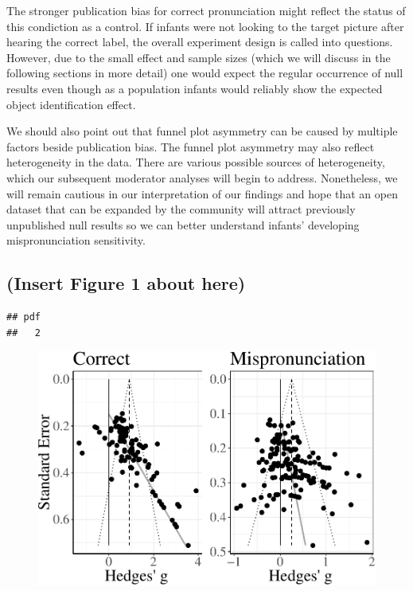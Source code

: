 \documentclass[man]{apa6}
\theoremstyle{definition}
\theoremstyle{definition}
\theoremstyle{definition}
\theoremstyle{remark}
\begin{document}
The stronger publication bias for correct pronunciation might reflect
the status of this condiction as a control. If infants were not looking
to the target picture after hearing the correct label, the overall
experiment design is called into questions. However, due to the small
effect and sample sizes (which we will discuss in the following sections
in more detail) one would expect the regular occurrence of null results
even though as a population infants would reliably show the expected
object identification effect.

We should also point out that funnel plot asymmetry can be caused by
multiple factors beside publication bias. The funnel plot asymmetry may
also reflect heterogeneity in the data. There are various possible
sources of heterogeneity, which our subsequent moderator analyses will
begin to address. Nonetheless, we will remain cautious in our
interpretation of our findings and hope that an open dataset that can be
expanded by the community will attract previously unpublished null
results so we can better understand infants' developing mispronunciation
sensitivity.

\subsection{(Insert Figure 1 about
here)}\label{insert-figure-1-about-here}

\begin{verbatim}
## pdf 
##   2
\end{verbatim}

\begin{figure}
\centering
\includegraphics{Paper_Analyses_files/figure-latex/FunnelCombo-1.pdf}
\caption{}
\end{figure}
\end{document}
